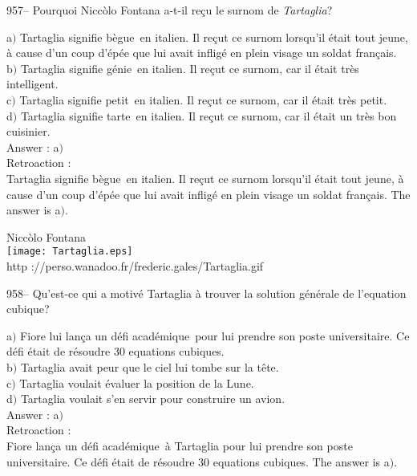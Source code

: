 ﻿\documentclass[letterpaper, 12pt]{article}
\begin{document}
957-- Pourquoi Nicc\`olo Fontana a-t-il re\c cu le surnom de {\sl
Tartaglia}?

a$)$ Tartaglia signifie \og b\`egue\fg\ en italien. Il re\c cut ce
surnom lorsqu'il \'etait tout jeune, \`a cause d'un coup d'\'ep\'ee
que lui avait inflig\'e en plein visage un
soldat fran\c cais. \\
b$)$ Tartaglia signifie \og g\'enie\fg\ en italien. Il re\c cut ce
surnom, car il
\'etait tr\`es intelligent.  \\
c$)$ Tartaglia signifie \og petit\fg\ en italien. Il re\c cut ce
surnom, car il \'etait tr\`es petit.  \\
d$)$ Tartaglia signifie \og tarte\fg\ en italien. Il re\c cut ce
surnom, car il \'etait un tr\`es bon cuisinier.\\

Answer : a$)$\\

Retroaction :\\
Tartaglia signifie \og b\`egue\fg\ en italien. Il re\c cut ce surnom
lorsqu'il \'etait tout jeune, \`a cause d'un coup d'\'ep\'ee  que
lui avait inflig\'e en plein visage un
soldat fran\c cais. The answer is a$)$.\\

        \begin{center}
        Nicc\`olo Fontana\\
    \texttt{[image: Tartaglia.eps]}\\
        {\footnotesize http
://perso.wanadoo.fr/frederic.gales/Tartaglia.gif}
    \end{center}

958-- Qu'est-ce qui a motiv\'e Tartaglia \`a trouver la solution
g\'en\'erale de l'equation cubique?

a$)$ Fiore lui lan\c ca un \og d\'efi acad\'emique\fg\ pour lui
prendre son poste universitaire. Ce d\'efi \'etait
de r\'esoudre 30 equations cubiques. \\
b$)$ Tartaglia avait peur que le ciel lui tombe sur la t\^ete.   \\
c$)$ Tartaglia voulait \'evaluer la position de la Lune.   \\
d$)$ Tartaglia voulait s'en servir pour construire un avion. \\

Answer : a$)$\\

Retroaction : \\
Fiore lan\c ca un \og d\'efi acad\'emique\fg\ \`a Tartaglia pour lui
prendre son poste universitaire. Ce d\'efi \'etait
de r\'esoudre 30 equations cubiques. The answer is a$)$.\\
\end{document}
